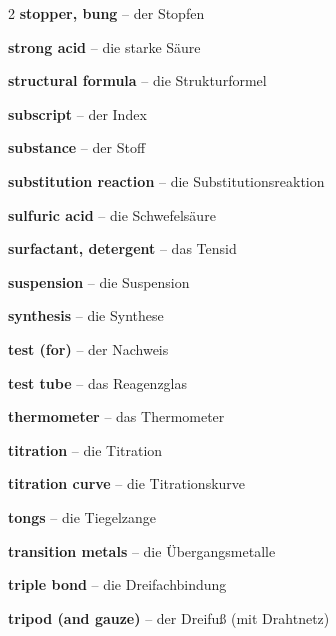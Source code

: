 \begin{multicols}{2}
\textbf{stopper, bung} -- der Stopfen\dotfill\hyperref[e:60]{\pageref*{e:60}}\par
\textbf{strong acid} -- die starke Säure\dotfill\hyperref[e:168]{\pageref*{e:168}}\par
\textbf{structural formula} -- die Strukturformel\dotfill\hyperref[e:103]{\pageref*{e:103}}\par
\textbf{subscript} -- der Index\dotfill\hyperref[e:132]{\pageref*{e:132}}\par
\textbf{substance} -- der Stoff\dotfill\hyperref[e:1]{\pageref*{e:1}}\par
\textbf{substitution reaction} -- die Substitutionsreaktion\dotfill\hyperref[e:229]{\pageref*{e:229}}\par
\textbf{sulfuric acid} -- die Schwefelsäure\dotfill\hyperref[e:179]{\pageref*{e:179}}\par
\textbf{surfactant, detergent} -- das Tensid\dotfill\hyperref[e:246]{\pageref*{e:246}}\par
\textbf{suspension} -- die Suspension\dotfill\hyperref[e:15]{\pageref*{e:15}}\par
\textbf{synthesis} -- die Synthese\dotfill\hyperref[e:133]{\pageref*{e:133}}\par

\par\nopagebreak
\textbf{test (for)} -- der Nachweis\dotfill\hyperref[e:151]{\pageref*{e:151}}\par
\textbf{test tube} -- das Reagenzglas\dotfill\hyperref[e:39]{\pageref*{e:39}}\par
\textbf{thermometer} -- das Thermometer\dotfill\hyperref[e:57]{\pageref*{e:57}}\par
\textbf{titration} -- die Titration\dotfill\hyperref[e:173]{\pageref*{e:173}}\par
\textbf{titration curve} -- die Titrationskurve\dotfill\hyperref[e:174]{\pageref*{e:174}}\par
\textbf{tongs} -- die Tiegelzange\dotfill\hyperref[e:61]{\pageref*{e:61}}\par
\textbf{transition metals} -- die Übergangsmetalle\dotfill\hyperref[e:92]{\pageref*{e:92}}\par
\textbf{triple bond} -- die Dreifachbindung\dotfill\hyperref[e:114]{\pageref*{e:114}}\par
\textbf{tripod (and gauze)} -- der Dreifuß (mit Drahtnetz)\dotfill\hyperref[e:47]{\pageref*{e:47}}\par


\end{multicols}
